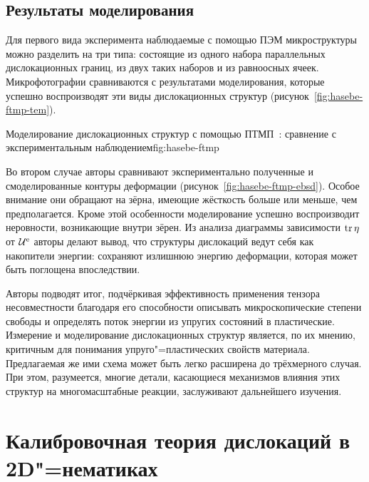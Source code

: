 \documentclass[a4paper, 14pt, titlepage]{extarticle}
\newcommand{\elast}{\textup{e}}%
\begin{document}
  \subsection{Результаты моделирования}

  Для первого вида эксперимента наблюдаемые с помощью ПЭМ микроструктуры можно разделить на три
  типа: состоящие из одного набора параллельных дислокационных границ, из двух таких наборов и из
  равноосных ячеек. Микрофотографии сравниваются с результатами моделирования, которые успешно
  воспроизводят эти виды дислокационных структур (рисунок~\ref{fig:hasebe-ftmp-tem}).

  \begin{myfigure}{Моделирование дислокационных структур с помощью ПТМП~\cite{hasebe-ftmp}: сравнение с экспериментальным наблюдением}{fig:hasebe-ftmp}
    \hspace{0.05\textwidth}
  \end{myfigure}

  Во втором случае авторы сравнивают экспериментально полученные и смоделированные контуры
  деформации (рисунок~\ref{fig:hasebe-ftmp-ebsd}). Особое внимание они обращают на зёрна, имеющие
  жёсткость больше или меньше, чем предполагается. Кроме этой особенности моделирование успешно
  воспроизводит неровности, возникающие внутри зёрен. Из анализа диаграммы зависимости $\operatorname{tr}\eta$ от
  $\mathcal{U}^\elast$ авторы делают вывод, что структуры дислокаций ведут себя как накопители
  энергии: сохраняют излишнюю энергию деформации, которая может быть поглощена впоследствии.

  Авторы подводят итог, подчёркивая эффективность применения тензора несовместности благодаря его
  способности описывать микроскопические степени свободы и определять поток энергии из упругих
  состояний в пластические. Измерение и моделирование дислокационных структур является, по их
  мнению, критичным для понимания упруго"=пластических свойств материала. Предлагаемая же ими схема
  может быть легко расширена до трёхмерного случая. При этом, разумеется, многие детали, касающиеся
  механизмов влияния этих структур на многомасштабные реакции, заслуживают дальнейшего изучения.

  \section{Калибровочная теория дислокаций в 2D"=нематиках}
\end{document}
